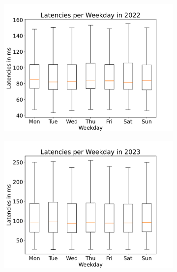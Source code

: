 \begin{figure}
	\centering
	\begin{subfigure}[b]{0.32\linewidth}
		\includegraphics[width=\linewidth]{chapters/4-results/latency/img/latency_2022_weekdays.pdf}
	\end{subfigure}
	\begin{subfigure}[b]{0.32\linewidth}
		\includegraphics[width=\linewidth]{chapters/4-results/latency/img/latency_2023_weekdays.pdf}
	\end{subfigure}
	\begin{subfigure}[b]{0.32\linewidth}

\end{subfigure}
\end{figure}
